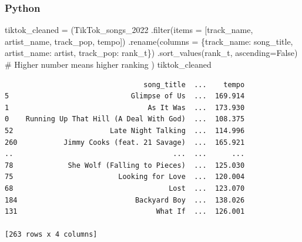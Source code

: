 \documentclass[
  letterpaper,
  DIV=11,
  numbers=noendperiod]{scrreprt}
\newenvironment{Shaded}{\begin{snugshade}}{\end{snugshade}}
\newcommand{\BuiltInTok}[1]{\textcolor[rgb]{0.00,0.23,0.31}{#1}}
\newcommand{\CommentTok}[1]{\textcolor[rgb]{0.37,0.37,0.37}{#1}}
\newcommand{\NormalTok}[1]{\textcolor[rgb]{0.00,0.23,0.31}{#1}}
\newcommand{\OperatorTok}[1]{\textcolor[rgb]{0.37,0.37,0.37}{#1}}
\newcommand{\StringTok}[1]{\textcolor[rgb]{0.13,0.47,0.30}{#1}}
\newcommand{\VariableTok}[1]{\textcolor[rgb]{0.07,0.07,0.07}{#1}}
\begin{document}
\subsubsection{Python}

\begin{Shaded}
\begin{Highlighting}[]
\NormalTok{tiktok\_cleaned }\OperatorTok{=}\NormalTok{ (TikTok\_songs\_2022}
\NormalTok{                   .}\BuiltInTok{filter}\NormalTok{(items }\OperatorTok{=}\NormalTok{ [}\StringTok{\textquotesingle{}track\_name\textquotesingle{}}\NormalTok{, }\StringTok{\textquotesingle{}artist\_name\textquotesingle{}}\NormalTok{, }\StringTok{\textquotesingle{}track\_pop\textquotesingle{}}\NormalTok{, }\StringTok{\textquotesingle{}tempo\textquotesingle{}}\NormalTok{])}
\NormalTok{                   .rename(columns }\OperatorTok{=}\NormalTok{ \{}\StringTok{\textquotesingle{}track\_name\textquotesingle{}}\NormalTok{: }\StringTok{\textquotesingle{}song\_title\textquotesingle{}}\NormalTok{,}
                                      \StringTok{\textquotesingle{}artist\_name\textquotesingle{}}\NormalTok{: }\StringTok{\textquotesingle{}artist\textquotesingle{}}\NormalTok{,}
                                      \StringTok{\textquotesingle{}track\_pop\textquotesingle{}}\NormalTok{: }\StringTok{\textquotesingle{}rank\_t\textquotesingle{}}\NormalTok{\})}
\NormalTok{                   .sort\_values(}\StringTok{\textquotesingle{}rank\_t\textquotesingle{}}\NormalTok{, ascending}\OperatorTok{=}\VariableTok{False}\NormalTok{) }\CommentTok{\# Higher number means higher ranking}
\NormalTok{                  )}
\NormalTok{tiktok\_cleaned}
\end{Highlighting}
\end{Shaded}

\begin{verbatim}
                                 song_title  ...    tempo
5                             Glimpse of Us  ...  169.914
1                                 As It Was  ...  173.930
0    Running Up That Hill (A Deal With God)  ...  108.375
52                       Late Night Talking  ...  114.996
260           Jimmy Cooks (feat. 21 Savage)  ...  165.921
..                                      ...  ...      ...
78             She Wolf (Falling to Pieces)  ...  125.030
75                         Looking for Love  ...  120.004
68                                     Lost  ...  123.070
184                            Backyard Boy  ...  138.026
131                                 What If  ...  126.001

[263 rows x 4 columns]
\end{verbatim}
\end{document}
